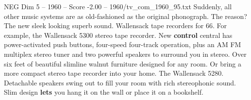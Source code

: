 \begin{textsample}{NEG Dim 5 – 1960 – Score -2.00 – 1960/tv\_com\_1960\_95.txt}  \label{ex:f5_neg_019}
Suddenly, all other music systems are as old-fashioned as the original phonograph.
The reason?
The new sleek looking superb sound.
Wallensack tape recorders for 66.
For example, the Wallensack 5300 stereo tape recorder.
New \textbf{control} central has power-activated push buttons, four-speed four-track operation, plus an AM FM multiplex stereo tuner and two powerful speakers to surround you in stereo.
Over six feet of beautiful slimline walnut furniture designed for any room.
Or bring a more compact stereo tape recorder into your home.
The Wallensack 5280.
Detachable speakers swing out to fill your room with rich stereophonic sound.
Slim design \textbf{lets} you hang it on the wall or place it on a bookshelf.

\end{textsample}
